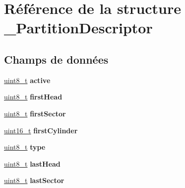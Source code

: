 \hypertarget{struct__PartitionDescriptor}{\section{\-Référence de la structure \-\_\-\-Partition\-Descriptor}
\label{struct__PartitionDescriptor}
}
\subsection*{\-Champs de données}
\begin{DoxyCompactItemize}
\item 
\hypertarget{struct__PartitionDescriptor_a7f5b269065ec0ed8f65a1bc00afd712e}{\hyperlink{types_8h_aba7bc1797add20fe3efdf37ced1182c5}{uint8\-\_\-t} {\bfseries active}}\label{struct__PartitionDescriptor_a7f5b269065ec0ed8f65a1bc00afd712e}

\item 
\hypertarget{struct__PartitionDescriptor_afb7ff15b362251f2788db0ba5c399f9a}{\hyperlink{types_8h_aba7bc1797add20fe3efdf37ced1182c5}{uint8\-\_\-t} {\bfseries first\-Head}}\label{struct__PartitionDescriptor_afb7ff15b362251f2788db0ba5c399f9a}

\item 
\hypertarget{struct__PartitionDescriptor_a0ea29bb1a4577930c23316f4aa76f7fe}{\hyperlink{types_8h_aba7bc1797add20fe3efdf37ced1182c5}{uint8\-\_\-t} {\bfseries first\-Sector}}\label{struct__PartitionDescriptor_a0ea29bb1a4577930c23316f4aa76f7fe}

\item 
\hypertarget{struct__PartitionDescriptor_a10bc83fdf064e25cc7aca555f047b70e}{\hyperlink{types_8h_adf4d876453337156dde61095e1f20223}{uint16\-\_\-t} {\bfseries first\-Cylinder}}\label{struct__PartitionDescriptor_a10bc83fdf064e25cc7aca555f047b70e}

\item 
\hypertarget{struct__PartitionDescriptor_a2ada512534c41aa57e4bb351d594bfa8}{\hyperlink{types_8h_aba7bc1797add20fe3efdf37ced1182c5}{uint8\-\_\-t} {\bfseries type}}\label{struct__PartitionDescriptor_a2ada512534c41aa57e4bb351d594bfa8}

\item 
\hypertarget{struct__PartitionDescriptor_ad88abb3baf9aacb18c2718c186f67d02}{\hyperlink{types_8h_aba7bc1797add20fe3efdf37ced1182c5}{uint8\-\_\-t} {\bfseries last\-Head}}\label{struct__PartitionDescriptor_ad88abb3baf9aacb18c2718c186f67d02}

\item 
\hypertarget{struct__PartitionDescriptor_a3630bb7241f436168573845c5f0fb51c}{\hyperlink{types_8h_aba7bc1797add20fe3efdf37ced1182c5}{uint8\-\_\-t} {\bfseries last\-Sector}}\label{struct__PartitionDescriptor_a3630bb7241f436168573845c5f0fb51c}


\end{DoxyCompactItemize}
